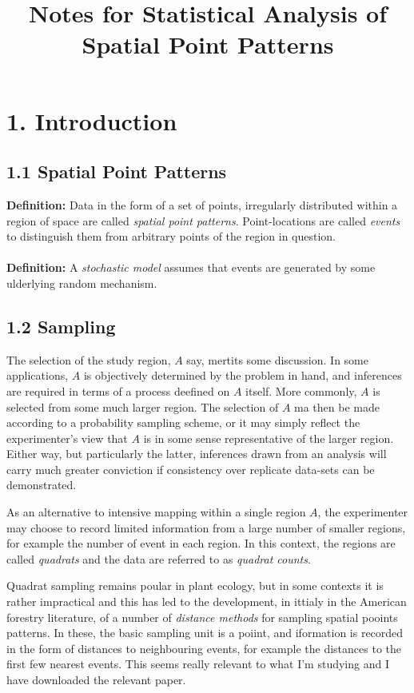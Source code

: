 \documentclass{article}
\title{Notes for Statistical Analysis of Spatial Point Patterns}
\begin{document}
\maketitle

\section*{1. Introduction}
\subsection*{1.1 Spatial Point Patterns}
{\bf Definition:} Data in the form of a set of points, irregularly distributed within a region of space are called {\it spatial point patterns}. Point-locations are called {\it events} to distinguish them from arbitrary points of the region in question.\\ \\
{\bf Definition:} A {\it stochastic model} assumes that events are generated by some ulderlying random mechanism. 
\subsection*{1.2 Sampling}
The selection of the study region, $A$ say, mertits some discussion. In some applications, $A$ is objectively determined by the problem in hand, and inferences are required in terms of a process deefined on $A$ itself. More commonly, $A$ is selected from some much larger region. The selection of $A$ ma then be made according to a probability sampling scheme, or it may simply reflect the experimenter's view that $A$ is in some sense representative of the larger region. Either way, but particularly the latter, inferences drawn from an analysis will carry much greater conviction if consistency over replicate data-sets can be demonstrated. 

As an alternative to intensive mapping within a single region $A$, the experimenter may choose to record limited information from a large number of smaller regions, for example the number of event in each region. In this context, the regions are called {\it quadrats} and the data are referred to as {\it quadrat counts}. 

Quadrat sampling remains poular in plant ecology, but in some contexts it is rather impractical and this has led to the development, in ittialy in the American forestry literature, of a number of {\it distance methods} for sampling spatial pooints patterns. In these, the basic sampling unit is a poiint, and iformation is recorded in the form of distances to neighbouring events, for example the distances to the first few nearest events. This seems really relevant to what I'm studying and I have downloaded the relevant paper. 
\end{document}
